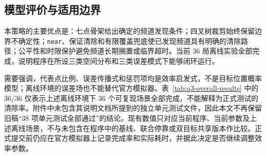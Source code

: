 \subsection{模型评价与适用边界}

本策略的主要优点是：七点骨架给出确定的频道发现条件；四叉树裁剪始终保留边界不确定性；\texttt{near}、保证清除和有限覆盖兜底使已发现频道具有明确的清除路径；公平性和时限保护避免频道长期搁置或临界超时。当前 36 局离线实验全部完成，说明程序在所设三类空间分布和三类误差模式下能够闭环运行。

需要强调，代表点比例、误差传播式和惩罚项均是效率启发式，不是目标位置概率模型；离线环境的误差场也不能替代官方模拟器。表~\ref{tab:q3-overall-results} 中的 36/36 仅表示上述离线环境下 36 个可复现场景全部完成，不能解释为正式测试的清除率。附件中未包含其说明文档所提到的独立单元测试文件，因此本文不再保留旧稿“38 项单元测试全部通过”的结论。现有数值只对应当前程序、当前参数及上述离线场景，不与未包含在程序中的基线、联合停靠或双目标共享版本作比较。正式提交前仍应在官方模拟器上记录完成率和实际耗时，并据此决定是否继续调整效率参数。
